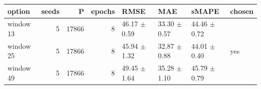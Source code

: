 \begin{tabular}{lrrrllll}
\toprule
option & seeds & P & epochs & RMSE & MAE & sMAPE & chosen \\
\midrule
window 13 & 5 & 17866 & 8 & 46.17 $\pm$ 0.59 & 33.30 $\pm$ 0.57 & 44.46 $\pm$ 0.72 &  \\
window 25 & 5 & 17866 & 8 & 45.94 $\pm$ 1.32 & 32.87 $\pm$ 0.88 & 44.01 $\pm$ 0.40 & yes \\
window 49 & 5 & 17866 & 8 & 49.45 $\pm$ 1.64 & 35.28 $\pm$ 1.10 & 45.79 $\pm$ 0.79 &  \\
\bottomrule
\end{tabular}
